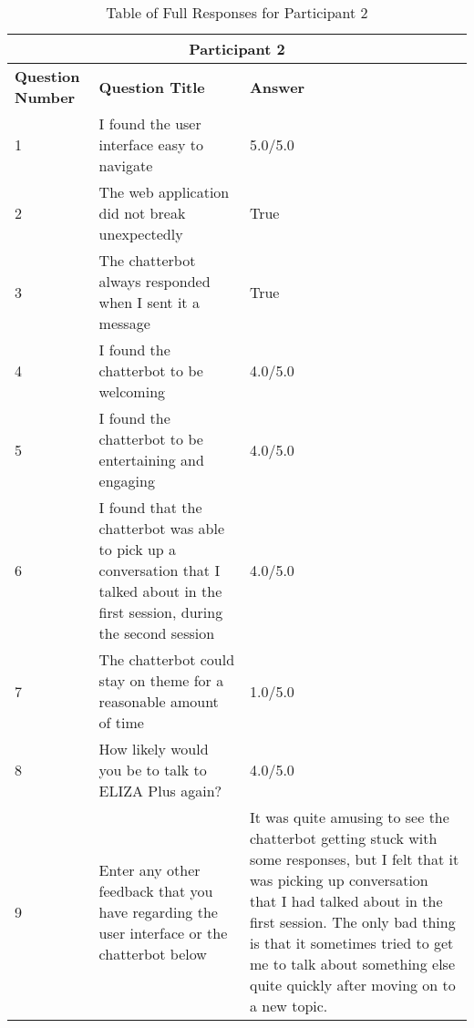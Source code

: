 \begin{table}[H]
	\centering
	\begin{tabular}{ |m{1.8cm}|m{6.5cm}| m{7cm}|} 
		\hline
		\multicolumn{3}{|c|}{Participant 2} \\
		\hline
		\textbf{Question Number} & \textbf{Question Title} & \textbf{Answer}\\ 
		\hline
		1 & I found the user interface easy to navigate & 5.0/5.0\\ 
		\hline
		2 & 
		The web application did not break unexpectedly & True \\ 
		\hline
		3 & The chatterbot always responded when I sent it a message & True\\
		\hline 
		4 & I found the chatterbot to be welcoming & 4.0/5.0\\
		\hline
		5 & I found the chatterbot to be entertaining and engaging & 4.0/5.0\\
		\hline
		6 & I found that the chatterbot was able to pick up a conversation that I talked about in the first session, during the second session  & 4.0/5.0\\
		\hline
		7 & The chatterbot could stay on theme for a reasonable amount of time & 1.0/5.0 \\
		\hline
		8 & 
		How likely would you be to talk to ELIZA Plus again? & 4.0/5.0\\
		\hline
		9 & 
		Enter any other feedback that you have regarding the user interface or the chatterbot below & It was quite amusing to see the chatterbot getting stuck with some responses, but I felt that it was picking up conversation that I had talked about in the first session. The only bad thing is that it sometimes tried to get me to talk about something else quite quickly after moving on to a new topic.\\
		\hline
	\end{tabular}
	\caption{Table of Full Responses for Participant 2}
\end{table}

